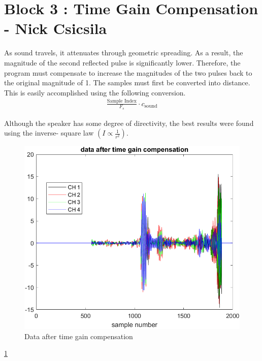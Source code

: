 \section{Block 3 : Time Gain Compensation - Nick Csicsila}

As sound travels, it attenuates through geometric spreading.  As a result, the magnitude of the second reflected pulse is significantly lower. Therefore, the program must compensate to increase the magnitudes of the two pulses back to the original magnitude of 1. 
    The samples must first be converted into distance. This is easily accomplished using the following conversion.
    \begin{align*}
     \frac{\text{Sample Index}}{F_s} \cdot c_{\text{sound}}    
    \end{align*}
    

    Although the speaker has some degree of directivity, the best results were found using the inverse- square law $(I \propto  \frac{1} {r^2} )$. 

    \begin{figure}[H]
        \centering
        \includegraphics[width=0.5\linewidth]{figures/time_gain_1.png}
        \caption{Data after time gain compensation}
        \label{fig:time_gain1}
    \end{figure}

    \ref{fig:time_gain1}

